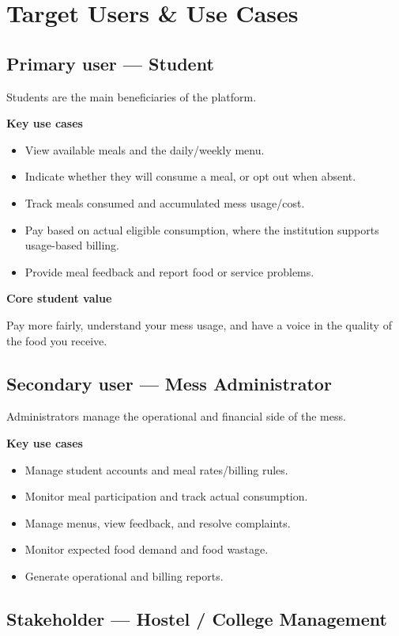 \documentclass[12pt,a4paper]{article}
\begin{document}
\section{Target Users \& Use Cases}

\subsection*{Primary user --- Student}

Students are the main beneficiaries of the platform.

\textbf{Key use cases}
\begin{itemize}
    \item View available meals and the daily/weekly menu.
    \item Indicate whether they will consume a meal, or opt out when absent.
    \item Track meals consumed and accumulated mess usage/cost.
    \item Pay based on actual eligible consumption, where the institution supports
          usage-based billing.
    \item Provide meal feedback and report food or service problems.
\end{itemize}

\textbf{Core student value}

Pay more fairly, understand your mess usage, and have a voice in the quality of
the food you receive.

\subsection*{Secondary user --- Mess Administrator}

Administrators manage the operational and financial side of the mess.

\textbf{Key use cases}
\begin{itemize}
    \item Manage student accounts and meal rates/billing rules.
    \item Monitor meal participation and track actual consumption.
    \item Manage menus, view feedback, and resolve complaints.
    \item Monitor expected food demand and food wastage.
    \item Generate operational and billing reports.
\end{itemize}

\subsection*{Stakeholder --- Hostel / College Management}
\end{document}
